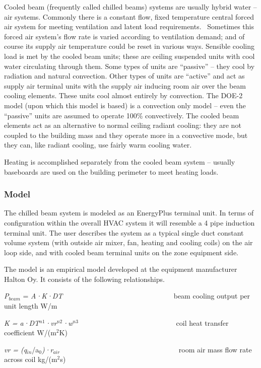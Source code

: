 Cooled beam (frequently called chilled beams) systems are usually hybrid water -- air systems. Commonly there is a constant flow, fixed temperature central forced air system for meeting ventilation and latent load requirements.~ Sometimes this forced air system's flow rate is varied according to ventilation demand; and of course its supply air temperature could be reset in various ways. Sensible cooling load is met by the cooled beam units; these are ceiling suspended units with cool water circulating through them. Some types of units are ``passive'' -- they cool by radiation and natural convection. Other types of units are ``active'' and act as supply air terminal units with the supply air inducing room air over the beam cooling elements. These units cool almost entirely by convection. The DOE-2 model (upon which this model is based) is a convection only model -- even the ``passive'' units are assumed to operate 100\% convectively. The cooled beam elements act as an alternative to normal ceiling radiant cooling: they are not coupled to the building mass and they operate more in a convective mode, but they can, like radiant cooling, use fairly warm cooling water.

Heating is accomplished separately from the cooled beam system -- usually baseboards are used on the building perimeter to meet heating loads.

\subsubsection{Model}\label{model-3}

The chilled beam system is modeled as an EnergyPlus terminal unit. In terms of configuration within the overall HVAC system it will resemble a 4 pipe induction terminal unit. The user describes the system as a typical single duct constant volume system (with outside air mixer, fan, heating and cooling coils) on the air loop side, and with cooled beam terminal units on the zone equipment side.

The model is an empirical model developed at the equipment manufacturer Halton Oy. It consists of the following relationships.

\emph{P\(_{beam}\)} = \emph{A·K·DT~~~~~~~} ~~~~~~~~~~~~~~~~~~~~~~~ beam cooling output per unit length W/m

\emph{K = a·DT\(^{n1}\)·vr\(^{n2}\)·w\(^{n3}\)}~~~~~~~~~~~~~~~~~~~~~~~~~~~ coil heat transfer coefficient W/(m\(^{2}\)K)

\emph{vr = (q\(_{in}\)}/a\emph{\(_{0}\))·r\(_{air}\)}~~~~~~~~~~~~~~~~~~~~~~~~~~~~~~~~~ room air mass flow rate across coil kg/(m\(^{2}\)s)

